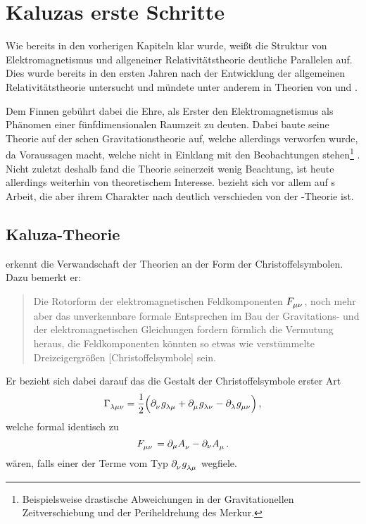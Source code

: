 \chapter{Kaluzas erste Schritte}
Wie bereits in den vorherigen Kapiteln klar wurde, weißt die Struktur von
Elektromagnetismus und allgeneiner Relativitätstheorie deutliche Parallelen auf.
Dies wurde bereits in den ersten Jahren nach der Entwicklung der
allgemeinen Relativitätstheorie untersucht und mündete
unter anderem in Theorien von \cite{weyl1918gravitation} und
 \cite{nordstrom1914moglichkeit}.

Dem Finnen  gebührt dabei die Ehre, als Erster den
Elektromagnetismus als Phänomen einer fünfdimensionalen Raumzeit zu deuten.
Dabei baute seine Theorie auf der schen Gravitationstheorie
auf, welche allerdings verworfen wurde, da Voraussagen macht, welche nicht in
Einklang mit den Beobachtungen stehen\footnote{Beispielsweise drastische
Abweichungen in der Gravitationellen Zeitverschiebung und der Periheldrehung des Merkur.} .
Nicht zuletzt deshalb fand die Theorie seinerzeit wenig Beachtung, ist heute
allerdings weiterhin von theoretischem Interesse.
 bezieht sich vor allem auf s Arbeit, die aber ihrem
Charakter nach deutlich verschieden von der -Theorie ist.
\section{Kaluza-Theorie}
 erkennt die Verwandschaft der Theorien an der Form der
Christoffelsymbolen. Dazu bemerkt er\cite{kaluza1921unitatsproblem}:
\begin{quote}
Die Rotorform der elektromagnetischen Feldkomponenten
$\tensor{F}{_\mu_\nu}$, noch mehr aber das
unverkennbare formale Entsprechen im Bau der Gravitations- 
und der elektromagnetischen Gleichungen fordern förmlich
die Vermutung heraus, die Feldkomponenten könnten so etwas wie
verstümmelte Dreizeigergrößen [Christoffelsymbole] sein.
\end{quote}
Er bezieht sich dabei darauf das die Gestalt der Christoffelsymbole erster Art
\begin{equation}
\tensor*{\Gamma}{_\lambda_\mu_\nu}=\frac{1}{2}
\left(\tensor{\partial}{_\nu} \tensor{g}{_\lambda_\mu} +
\tensor{\partial}{_\mu}
\tensor{g}{_\lambda_\nu} - \tensor{\partial}{_\lambda} 
\tensor{g}{_\mu_\nu}\right)\,,
\end{equation}
welche formal identisch zu 
\begin{equation}
\tensor{F}{_\mu_\nu}=\partial_\mu\tensor{A}{_\nu}-\partial_\nu\tensor{A}{_\mu}\,.
\end{equation}
wären, falls einer der Terme vom Typ $\tensor{\partial}{_\nu}
\tensor{g}{_\lambda_\mu}$ wegfiele.

